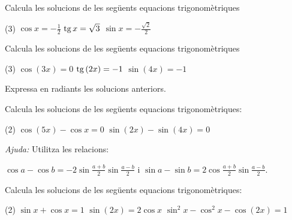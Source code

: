 \begin{mylist}
	\exer
	Calcula les solucions de les següents equacions trigonomètriques
	\begin{tasks}(3)
		\task $\cos x = -\frac{1}{2}$
		\task $\mathrm{tg}\, x = \sqrt{3}$
		\task $\sin x = -\frac{\sqrt{2}}{2}$
	\end{tasks}
\answers[cols=1]{[$x=120+n\cdot 360$ i $x=240+n\cdot 360$, $x=60+n 180$, $x=225+n\cdot 360$ i $x=315+n\cdot 360$]}
 
	
	\exer
	Calcula les solucions de les següents equacions trigonomètriques
	\begin{tasks}(3)
		\task $\cos(3 x) = 0$
		\task $\mathrm{tg}\,(2 x) = -1$
		\task $\sin(4 x) = -1$
	\end{tasks}
	Expressa en radiants les solucions anteriors.
 
 \answers[cols=1]{[$x=30+n\cdot 60$, $x=67.5+n\cdot 90$, $x=67.5+n\cdot 90$]}
	
	\exer
	Calcula les solucions de les següents equacions trigonomètriques:
	\begin{tasks}(2)
		\task $\cos(5 x) - \cos x = 0$
		\task $\sin(2 x) - \sin(4 x) = 0$
	\end{tasks}
	\textit{Ajuda:} Utilitza les relacions:\par \qquad $\cos a - \cos b =-2\sin \frac{a+b}{2} \sin \frac{a-b}{2}$ \quad i \quad $\sin a - \sin b =2\cos \frac{a+b}{2} \sin \frac{a-b}{2}$.
	
	\answers[cols=1]{[$x=n\cdot 60$ i $x=n\cdot 90$, $x=30+n\cdot 60$ i $x=n\cdot 180$]}
	
	\exer
	Calcula les solucions de les següents equacions trigonomètriques:
	\begin{tasks}(2)
		\task $\sin x + \cos x = 1$
		\task $\sin (2 x) = 2 \cos x$
		\task $\sin^2 x - \cos^2 x - \cos(2 x)=1$
	\end{tasks}
\answers[cols=1]{[$x=90+n\cdot 360$ i $x=n\cdot 360$, $x=90+n\cdot 180$, $x=60+n\cdot 180$  i $x=120+n\cdot 180$, $x=90+n\cdot 180$ i $x=68.53+n\cdot 360$ i $x=291.47+n\cdot 360$]}
	
\end{mylist}


